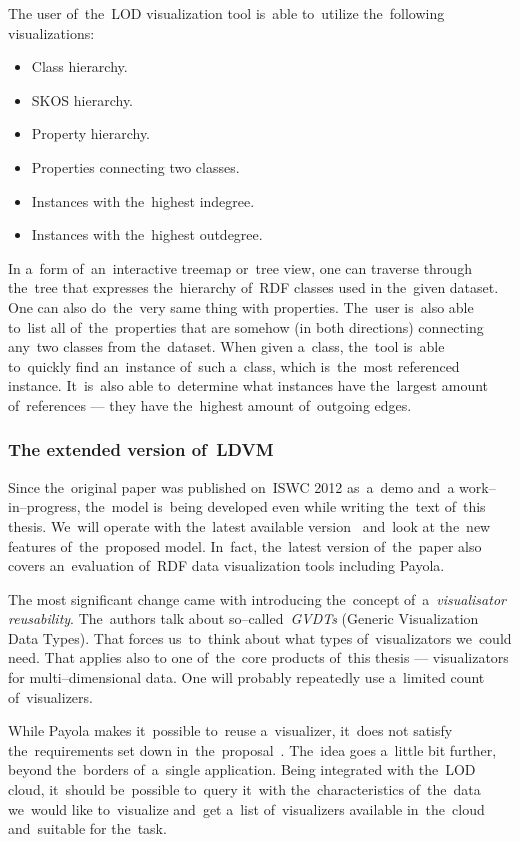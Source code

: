 The user of~the~LOD visualization tool is~able to~utilize the~following 
visualizations:

\begin{itemize}
\item Class hierarchy.
\item SKOS hierarchy.
\item Property hierarchy.
\item Properties connecting two classes.
\item Instances with the~highest indegree.
\item Instances with the~highest outdegree.
\end{itemize}

In a~form of~an~interactive treemap or~tree view, one 
can traverse through the~tree that expresses the~hierarchy of~RDF classes used 
in the~given dataset. One can also do~the~very same thing with properties. The~user is~also able to~list all of~the~properties that are somehow (in both directions)
connecting any~two classes from the~dataset. When given a~class, the~tool is~able to~quickly find an~instance of~such a~class, which is~the~most referenced
instance. It~is~also able to~determine what instances have the~largest amount of~references
--- they have the~highest amount of~outgoing
edges.

\subsubsection{The extended version of~LDVM}
Since the~original paper was published on~ISWC 2012 as~a~demo and~a
work--in--progress, the~model is~being developed even while writing the~text of~this thesis. We~will operate with the~latest available version~\cite{ldvm2} and~look 
at the~new features of~the~proposed model. In~fact, the~latest version of~the~paper also covers an~evaluation of~RDF data visualization tools including 
Payola.

The most significant change came with introducing the~concept of~a~\emph{visualisator 
reusability}. The~authors talk about so--called~\emph{GVDTs} (Generic Visualization Data Types).
That forces us~to~think about what types of~visualizators we~could need. That applies also to
one of~the~core products of~this thesis --- visualizators for multi--dimensional data.
One will probably repeatedly use a~limited count of~visualizers.

While Payola makes it~possible to~reuse a~visualizer, it~does not satisfy the~requirements set down in~the~proposal~\cite{ldvm2}. The~idea goes a~little bit 
further, beyond the~borders of~a~single application. Being integrated with the~LOD cloud, it~should be~possible to~query it~with the~characteristics of~the~data we~would like to~visualize and~get a~list of~visualizers 
available in~the~cloud and~suitable for the~task.


